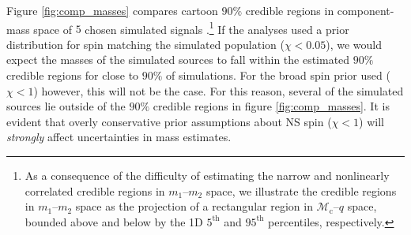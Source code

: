 Figure \ref{fig:comp_masses} compares cartoon $90\%$ credible regions in component-mass space of $5$ chosen simulated signals \citep[cf.][figure 1]{Chatziioannou_2014}.\footnote{As a consequence of the difficulty of estimating the narrow and nonlinearly correlated credible regions in $m_1$--$m_2$ space, we illustrate the credible regions in $m_1$--$m_2$ space as the projection of a rectangular region in $\mathcal{M}_\mathrm{c}$--$q$ space, bounded above and below by the 1D $5^\mathrm{th}$ and $95^\mathrm{th}$ percentiles, respectively.} If the analyses used a prior distribution for spin matching the simulated population ($\chi < 0.05$), we would expect the masses of the simulated sources to fall within the estimated $90\%$ credible regions for close to $90\%$ of simulations. For the broad spin prior used ($\chi < 1$) however, this will not be the case.  For this reason, several of the simulated sources lie outside of the $90\%$ credible regions in figure \ref{fig:comp_masses}.  It is evident that overly conservative prior assumptions about NS spin ($\chi < 1$) will \emph{strongly} affect uncertainties in mass estimates.
  
  
  